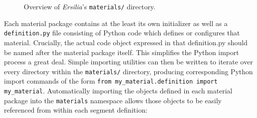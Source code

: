 \begin{figure}[h!]
\begin{singlespacing}
\vspace{-0.5\baselineskip}
\end{singlespacing}
\caption{Overview of \emph{Ersilia}'s \texttt{materials/} directory.}
\end{figure}

Each material package contains at the least its own initializer as well as a
\texttt{definition.py} file consisting of Python code which defines or
configures that material. Crucially, the actual code object expressed in that
definition.py should be named after the material package itself. This
simplifies the Python import process a great deal. Simple importing utilities
can then be written to iterate over every directory within the
\texttt{materials/} directory, producing corresponding Python import commands
of the form \texttt{from my_material.definition
import my_material}. Automatically importing the objects defined in each
material package into the \texttt{materials} namespace allows those objects to
be easily referenced from within each segment definition:

\begin{comment}
<abjad>[text_width=105]
materials_names = dir(ersilia.materials)
materials_names = [x for x in materials_names if not x.startswith('_')]
print(materials_names)
</abjad>
\end{comment}

